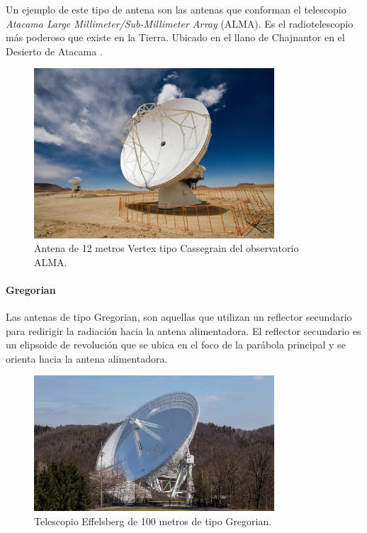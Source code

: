 Un ejemplo de este tipo de antena son las antenas que conforman el telescopio \textit{Atacama Large Millimeter/Sub-Millimeter Array} (ALMA). Es el radiotelescopio más poderoso que existe en la Tierra. Ubicado en el llano de Chajnantor en el Desierto de Atacama \cite{alma}.

\begin{figure}
    \centering
    \includegraphics[width = 0.8\textwidth]{img/cassegrain.jpg}
    \caption{Antena de 12 metros Vertex tipo Cassegrain del observatorio ALMA.}
    \label{fig:cass}
\end{figure}


\paragraph{Gregorian}

Las antenas de tipo Gregorian, son aquellas que utilizan un reflector secundario para redirigir la radiación hacia la antena alimentadora. El reflector secundario es un elipsoide de revolución que se ubica en el foco de la parábola principal y se orienta hacia la antena alimentadora.

\begin{figure}
    \centering
    \includegraphics[width = 0.8\textwidth]{img/gregorian.jpg}
    \caption{Telescopio Effelsberg de 100 metros de tipo Gregorian.}
    \label{fig:greg}
\end{figure}

